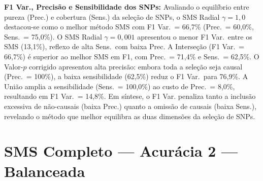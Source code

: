 \documentclass[
    12pt,
    a4paper,
    oneside,
    english,
    french,
    spanish,
    brazil
    ]{abntex2}
\newcommand{\novo}[1]{\textcolor{corNova}{#1}}
\begin{document}
\novo{\textbf{F1 Var., Precisão e Sensibilidade dos SNPs:} Avaliando o equilíbrio entre pureza (Prec.) e cobertura (Sens.) da seleção de SNPs, o SMS Radial $\gamma=1{,}0$ destacou-se como o melhor método SMS com F1 Var.\ = 66,7\% (Prec.\ = 60,0\%, Sens.\ = 75,0\%). O SMS Radial $\gamma=0{,}001$ apresentou o menor F1 Var.\ entre os SMS (13,1\%), reflexo de alta Sens.\ com baixa Prec. A Interseção (F1 Var.\ = 66,7\%) é superior ao melhor SMS em F1, com Prec.\ = 71,4\% e Sens.\ = 62,5\%. O Valor-$p$ corrigido apresentou alta precisão: embora toda a seleção seja causal (Prec.\ = 100\%), a baixa sensibilidade (62,5\%) reduz o F1 Var.\ para 76,9\%. A União amplia a sensibilidade (Sens.\ = 100,0\%) ao custo de Prec.\ = 8,0\%, resultando em F1 Var.\ = 14,8\%. Em síntese, o F1 Var. penaliza tanto a inclusão excessiva de não-causais (baixa Prec.) quanto a omissão de causais (baixa Sens.), revelando o método que melhor equilibra as duas dimensões da seleção de SNPs.}
\section{SMS Completo --- Acurácia 2 --- Balanceada}
\end{document}
